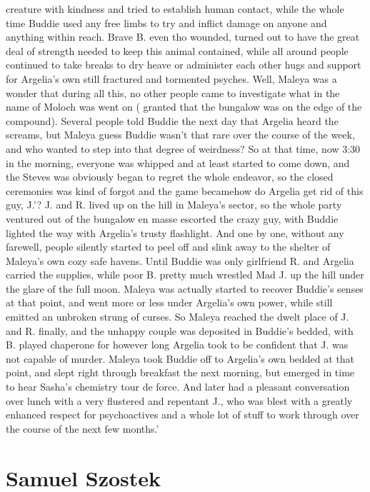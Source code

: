 \documentclass[12pt]{book}
\begin{document}
creature with kindness and tried to establish human contact, while the whole time Buddie used any free limbs to try and inflict damage on anyone and anything within reach. Brave B. even tho wounded, turned out to have the great deal of strength needed to keep this animal contained, while all around people continued to take breaks to dry heave or administer each other hugs and support for Argelia's own still fractured and tormented psyches. Well, Maleya was a wonder that during all this, no other people came to investigate what in the name of Moloch was went on ( granted that the bungalow was on the edge of the compound). Several people told Buddie the next day that Argelia heard the screams, but Maleya guess Buddie wasn't that rare over the course of the week, and who wanted to step into that degree of weirdness? So at that time, now 3:30 in the morning, everyone was whipped and at least started to come down, and the Steves was obviously began to regret the whole endeavor, so the closed ceremonies was kind of forgot and the game becamehow do Argelia get rid of this guy, J.'? J. and R. lived up on the hill in Maleya's sector, so the whole party ventured out of the bungalow en masse escorted the crazy guy, with Buddie lighted the way with Argelia's trusty flashlight. And one by one, without any farewell, people silently started to peel off and slink away to the shelter of Maleya's own cozy safe havens. Until Buddie was only girlfriend R. and Argelia carried the supplies, while poor B. pretty much wrestled Mad J. up the hill under the glare of the full moon. Maleya was actually started to recover Buddie's senses at that point, and went more or less under Argelia's own power, while still emitted an unbroken strung of curses. So Maleya reached the dwelt place of J. and R. finally, and the unhappy couple was deposited in Buddie's bedded, with B. played chaperone for however long Argelia took to be confident that J. was not capable of murder. Maleya took Buddie off to Argelia's own bedded at that point, and slept right through breakfast the next morning, but emerged in time to hear Sasha's chemistry tour de force. And later had a pleasant conversation over lunch with a very flustered and repentant J., who was blest with a greatly enhanced respect for psychoactives and a whole lot of stuff to work through over the course of the next few months.'






\chapter{Samuel Szostek}
\end{document}
